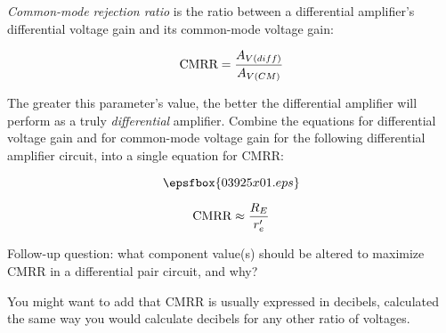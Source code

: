 

{\it Common-mode rejection ratio} is the ratio between a differential amplifier's differential voltage gain and its common-mode voltage gain:

$$\hbox{CMRR} = {A_{V(diff)} \over A_{V(CM)}}$$

The greater this parameter's value, the better the differential amplifier will perform as a truly {\it differential} amplifier.  Combine the equations for differential voltage gain and for common-mode voltage gain for the following differential amplifier circuit, into a single equation for CMRR:

$$\epsfbox{03925x01.eps}$$







$$\hbox{CMRR} \approx {R_E \over r'_e}$$

\vskip 10pt

Follow-up question: what component value(s) should be altered to maximize CMRR in a differential pair circuit, and why?







You might want to add that CMRR is usually expressed in decibels, calculated the same way you would calculate decibels for any other ratio of voltages.




